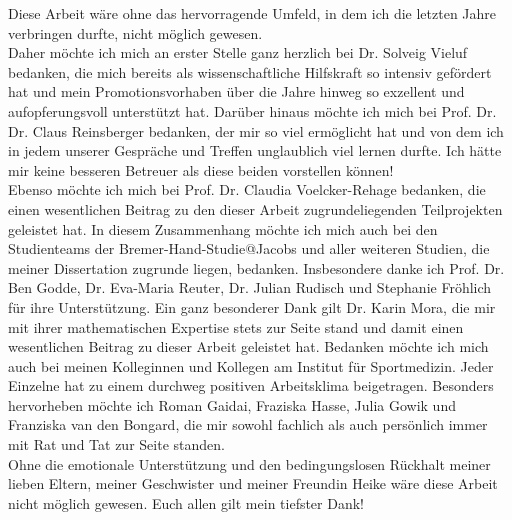 Diese Arbeit wäre ohne das hervorragende Umfeld, in dem ich die letzten Jahre verbringen durfte, nicht möglich gewesen.\\
Daher möchte ich mich an erster Stelle ganz herzlich bei Dr. Solveig Vieluf bedanken, die mich bereits als wissenschaftliche Hilfskraft so intensiv gefördert hat und mein Promotionsvorhaben über die Jahre hinweg so exzellent und aufopferungsvoll unterstützt hat. Darüber hinaus möchte ich mich bei Prof. Dr. Dr. Claus Reinsberger bedanken, der mir so viel ermöglicht hat und von dem ich in jedem unserer Gespräche und Treffen unglaublich viel lernen durfte. Ich hätte mir keine besseren Betreuer als diese beiden vorstellen können!\\
Ebenso möchte ich mich bei Prof. Dr. Claudia Voelcker-Rehage bedanken, die einen wesentlichen Beitrag zu den dieser Arbeit zugrundeliegenden Teilprojekten geleistet hat. In diesem Zusammenhang möchte ich mich auch bei den Studienteams der Bremer-Hand-Studie@Jacobs und aller weiteren Studien, die meiner Dissertation zugrunde liegen, bedanken. Insbesondere danke ich Prof. Dr. Ben Godde, Dr. Eva-Maria Reuter, Dr. Julian Rudisch und Stephanie Fröhlich für ihre Unterstützung. Ein ganz besonderer Dank gilt Dr. Karin Mora, die mir mit ihrer mathematischen Expertise stets zur Seite stand und damit einen wesentlichen Beitrag zu dieser Arbeit geleistet hat.
Bedanken möchte ich mich auch bei meinen Kolleginnen und Kollegen am Institut für Sportmedizin. Jeder Einzelne hat zu einem durchweg positiven Arbeitsklima beigetragen. Besonders hervorheben möchte ich Roman Gaidai, Fraziska Hasse, Julia Gowik und Franziska van den Bongard, die mir sowohl fachlich als auch persönlich immer mit Rat und Tat zur Seite standen.\\
Ohne die emotionale Unterstützung und den bedingungslosen Rückhalt meiner lieben Eltern, meiner Geschwister und meiner Freundin Heike wäre diese Arbeit nicht möglich gewesen. Euch allen gilt mein tiefster Dank!